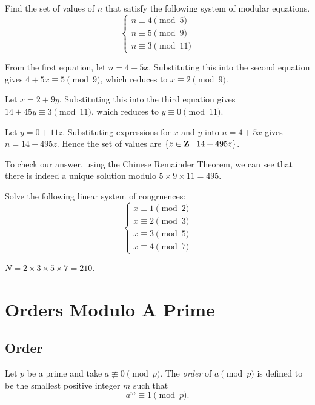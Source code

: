 \begin{exercise}
Find the set of values of $n$ that satisfy the following system of modular equations.
\[\begin{cases}
n \equiv 4 \pmod 5 \\
n \equiv 5 \pmod 9 \\
n \equiv 3 \pmod {11}
\end{cases}\]
\end{exercise}
\begin{solution}
From the first equation, let $n=4+5x$. Substituting this into the second equation gives $4+5x \equiv 5 \pmod 9$, which reduces to $x \equiv 2 \pmod 9$.

Let $x=2+9y$. Substituting this into the third equation gives $14+45y \equiv 3 \pmod {11}$, which reduces to $y \equiv 0 \pmod {11}$. 

Let $y=0+11z$. Substituting expressions for $x$ and $y$ into $n=4+5x$ gives $n=14+495z$. Hence the set of values are $\{z\in\mathbf Z \mid 14+495z\}$.

\begin{remark}
To check our answer, using the Chinese Remainder Theorem, we can see that there is indeed a unique solution modulo $5 \times 9 \times 11 = 495$.
\end{remark}
\end{solution}

\begin{exercise}
Solve the following linear system of congruences:
\[\begin{cases}
x \equiv 1\pmod 2 \\
x \equiv 2\pmod 3 \\
x \equiv 3\pmod 5 \\
x \equiv 4\pmod 7
\end{cases}\]
\end{exercise}
\begin{solution}
$N=2\times3\times5\times7=210$.

\end{solution}
\pagebreak

\section{Orders Modulo A Prime}
\subsection{Order}
\begin{definition}
Let $p$ be a prime and take $a \not\equiv 0 \pmod p$. The \emph{order} of $a \pmod p$ is defined to be the smallest positive integer $m$ such that 
\[a^m \equiv 1 \pmod p.\]
\end{definition}

